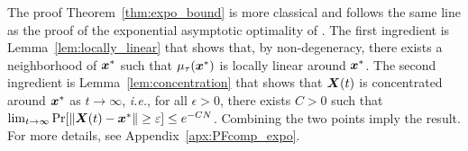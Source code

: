 The proof Theorem~\ref{thm:expo_bound} is more classical and follows the same line as the proof of the exponential asymptotic optimality of \cite{GGY23,HXCW24}. The first ingredient is Lemma~\ref{lem:locally_linear} that
 shows that, by non-degeneracy, there exists a neighborhood of ${\bm{x}}^*$ such that $\mu_\tau({\bm{x}}^*)$ is locally linear around ${\bm{x}}^*$. The second ingredient is Lemma~\ref{lem:concentration}
 that shows that ${\bm{X}(t)}$ is concentrated around ${\bm{x}}^*$ as $t\to\infty$, \emph{i.e.}, for all $\epsilon>0$, there exists $C>0$ such that $\lim_{t\to\infty} \Pr[\|{\bm{X}(t)}-{\bm{x}}^*\|\ge \varepsilon]\le e^{-C N}$. Combining the two points imply the result. For more details, see %
 Appendix~\ref{apx:PFcomp_expo}.
